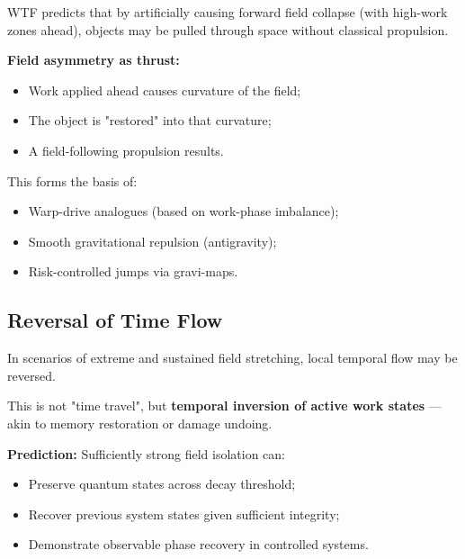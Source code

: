 WTF predicts that by artificially causing forward field collapse (with high-work zones ahead), objects may be pulled through space without classical propulsion.

\textbf{Field asymmetry as thrust:}  
\begin{itemize}
    \item Work applied ahead causes curvature of the field;
    \item The object is "restored" into that curvature;
    \item A field-following propulsion results.
\end{itemize}

This forms the basis of:
\begin{itemize}
    \item Warp-drive analogues (based on work-phase imbalance);
    \item Smooth gravitational repulsion (antigravity);
    \item Risk-controlled jumps via gravi-maps.
\end{itemize}

\vspace{10pt}

\subsection{Reversal of Time Flow}

In scenarios of extreme and sustained field stretching, local temporal flow may be reversed.

This is not "time travel", but \textbf{temporal inversion of active work states} — akin to memory restoration or damage undoing.

\textbf{Prediction:}  
Sufficiently strong field isolation can:
\begin{itemize}
    \item Preserve quantum states across decay threshold;
    \item Recover previous system states given sufficient integrity;
    \item Demonstrate observable phase recovery in controlled systems.
\end{itemize}
